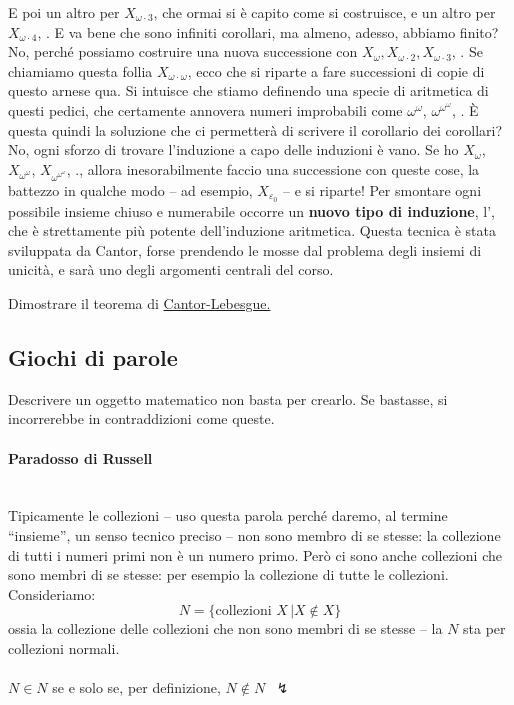E poi un altro per $X_{\omega \cdot 3}$, che ormai si \`e capito come si
costruisce, e un altro per $X_{\omega \cdot 4}$, \etc. E va bene che sono
infiniti corollari, ma almeno, adesso, abbiamo finito? No, perch\'e possiamo costruire una nuova successione con $X_{\omega},X_{\omega \cdot 2},X_{\omega \cdot 3}$, \etc.
Se chiamiamo questa follia $X_{\omega \cdot \omega}$, ecco che si riparte a
fare successioni di copie di questo arnese qua.
%
Si intuisce che stiamo definendo una specie di aritmetica di questi pedici,
che certamente annovera numeri improbabili come $\omega^\omega$, $\omega^{\omega^{\omega}}$, \etc.
\`E questa quindi la soluzione che ci permetter\`a di scrivere il corollario dei
corollari?
%
No, ogni sforzo di trovare l'induzione a capo delle induzioni \`e vano. Se ho $X_{\omega}$, $X_{\omega^\omega}$, $X_{\omega^{\omega^{\omega}}}$, \etc., allora
inesorabilmente faccio una successione con queste cose, la battezzo in qualche
modo -- ad esempio, $X_{\varepsilon_0}$ -- e si riparte!
%
Per smontare ogni possibile insieme chiuso e numerabile occorre un \textbf{nuovo tipo di induzione}, l', che \`e strettamente pi\`u potente dell'induzione aritmetica.
Questa tecnica \`e stata sviluppata da Cantor, forse prendendo le mosse dal problema degli insiemi di unicit\`a, e sar\`a uno degli argomenti centrali del corso.

\begin{exercise}
Dimostrare il teorema di \hyperref[CL]{Cantor-Lebesgue.}
\end{exercise}

\subsection{Giochi di parole}
Descrivere un oggetto matematico non basta per crearlo. Se bastasse, si incorrerebbe in contraddizioni come queste.
\paragraph*{Paradosso di Russell}\mbox{}\\
Tipicamente le collezioni -- uso questa parola perch\'e daremo, al termine
``insieme'', un senso tecnico preciso -- non sono membro di se stesse: la collezione di 
tutti i numeri primi non \`e un numero primo. Per\`o ci sono anche collezioni che sono membri di se stesse: per esempio la collezione di tutte le collezioni. Consideriamo:
\[ N = \{\text{collezioni $X$}\, | X \not\in X \}
	\]
ossia la collezione delle collezioni che non sono membri di se stesse -- la
$N$ sta per collezioni normali.\\
\\
$N \in N$ se e solo se, per definizione, $N \not \in N\;\;\lightning$

